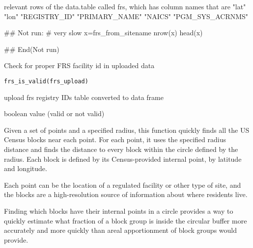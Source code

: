 \documentclass[a4paper]{book}
\begin{document}
%
\begin{Value}
relevant rows of the data.table called frs, which has column names that are
"lat" "lon" "REGISTRY\_ID" "PRIMARY\_NAME" "NAICS" "PGM\_SYS\_ACRNMS"
\end{Value}
%
\begin{Examples}
\begin{ExampleCode}
## Not run: 
 # very slow
 x=frs_from_sitename
 nrow(x)
 head(x)

## End(Not run)
\end{ExampleCode}
\end{Examples}
%
\begin{Description}\relax
Check for proper FRS facility id in uploaded data
\end{Description}
%
\begin{Usage}
\begin{verbatim}
frs_is_valid(frs_upload)
\end{verbatim}
\end{Usage}
%
\begin{Arguments}
\begin{ldescription}
\item[\code{frs\_upload}] upload frs registry IDs table converted to data frame
\end{ldescription}
\end{Arguments}
%
\begin{Value}
boolean value (valid or not valid)
\end{Value}
%
\begin{Description}\relax
Given a set of points and a specified radius,
this function quickly finds all the US Census blocks near each point.
For each point, it uses the specified radius distance and finds the distance to
every block within the circle defined by the radius.
Each block is defined by its Census-provided internal point, by latitude and longitude.

Each point can be the location of a regulated facility or other type of site, and
the blocks are a high-resolution source of information about where
residents live.

Finding which blocks have their internal points in a circle provides
a way to quickly estimate what fraction of a block group is
inside the circular buffer more accurately and more quickly than
areal apportionment of block groups would provide.
\end{Description}
\end{document}
